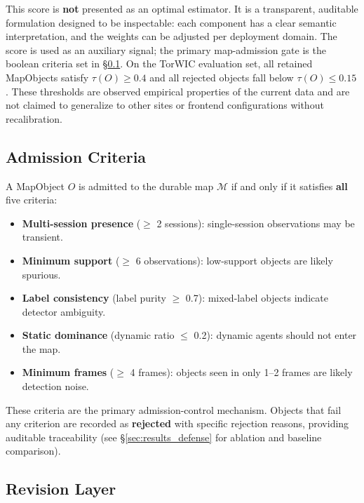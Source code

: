 \documentclass[journal]{IEEEtran}
\begin{document}
This score is \textbf{not} presented as an optimal estimator. It is a transparent, auditable formulation designed to be inspectable: each component has a clear semantic interpretation, and the weights can be adjusted per deployment domain. The score is used as an auxiliary signal; the primary map-admission gate is the boolean criteria set in \S\ref{sec:admission_criteria}. On the TorWIC evaluation set, all retained MapObjects satisfy $\tau(O) \geq 0.4$ and all rejected objects fall below $\tau(O) \leq 0.15$. These thresholds are observed empirical properties of the current data and are not claimed to generalize to other sites or frontend configurations without recalibration.

\subsection{Admission Criteria}
\label{sec:admission_criteria}

A MapObject $O$ is admitted to the durable map $\mathcal{M}$ if and only if it satisfies \textbf{all} five criteria:
\begin{itemize}
  \item \textbf{Multi-session presence} ($\geq$ 2 sessions): single-session observations may be transient.
  \item \textbf{Minimum support} ($\geq$ 6 observations): low-support objects are likely spurious.
  \item \textbf{Label consistency} (label purity $\geq$ 0.7): mixed-label objects indicate detector ambiguity.
  \item \textbf{Static dominance} (dynamic ratio $\leq$ 0.2): dynamic agents should not enter the map.
  \item \textbf{Minimum frames} ($\geq$ 4 frames): objects seen in only 1--2 frames are likely detection noise.
\end{itemize}
These criteria are the primary admission-control mechanism. Objects that fail any criterion are recorded as \textbf{rejected} with specific rejection reasons, providing auditable traceability (see \S\ref{sec:results_defense} for ablation and baseline comparison).

\subsection{Revision Layer}
\label{sec:revision}
\end{document}
